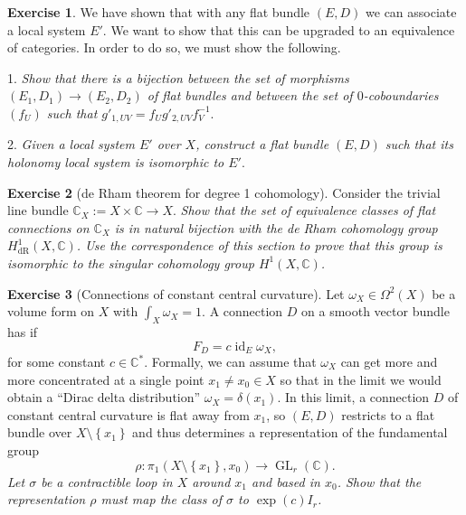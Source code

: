 \documentclass[12pt,a4paper]{amsbook}
\theoremstyle{remark} \newtheorem{rmk}[thm]{Remark}
\theoremstyle{definition} \newtheorem{defn}[thm]{Definition}
\theoremstyle{definition} \newtheorem{ex}[thm]{Example}
\theoremstyle{definition} \newtheorem{ej}{Exercise}
\let\emph\relax
\newcommand{\C}{\mathbb C}
\DeclareMathOperator{\GL}{GL}
\DeclareMathOperator{\id}{id}
\begin{document}
\begin{ej}
We have shown that with any flat bundle $(E,D)$ we can associate a local system $E'$. We want to show that this can be upgraded to an equivalence of categories. In order to do so, we must show the following.

1. \textit{Show that there is a bijection between the set of morphisms $(E_1,D_1)\rightarrow (E_2,D_2)$ of flat bundles and between the set of $0$-coboundaries $(f_U)$ such that $g'_{1,UV}=f_U g'_{2,UV} f_V^{-1}$}.

2. \textit{Given a local system $E'$ over $X$, construct a flat bundle $(E,D)$ such that its holonomy local system is isomorphic to $E'$}.
\end{ej}

\begin{ej}[de Rham theorem for degree 1 cohomology]
Consider the trivial line bundle $\C_X:=X\times \C\rightarrow X$. \textit{Show that the set of equivalence classes of flat connections on $\C_X$ is in natural bijection with the de Rham cohomology group  $H^1_{\mathrm{dR}}(X,\C)$. Use the correspondence of this section to prove that this group is isomorphic to the singular cohomology group $H^1(X,\C)$.}
\end{ej}

\begin{ej}[Connections of constant central curvature]
Let $\omega_X\in \Omega^2(X)$ be a volume form on $X$ with $\int_X \omega_X = 1$.	A connection $D$ on a smooth vector bundle has \emph{constant central curvature} if
\begin{equation*}
F_D = c \id_E \omega_X,
\end{equation*} 
for some constant $c\in \C^*$. Formally, we can assume that $\omega_X$ can get more and more concentrated at a single point $x_1\neq x_0 \in X$ so that in the limit we would obtain a ``Dirac delta distribution'' $\omega_X=\delta(x_1)$. In this limit, a connection $D$ of constant central curvature is flat away from $x_1$, so $(E,D)$ restricts to a flat bundle over $X\setminus \left\{x_1\right\}$ and thus determines a representation of the fundamental group
\begin{equation*}
\rho: \pi_1(X\setminus \left\{ x_1 \right\},x_0) \rightarrow \GL_r(\C).
\end{equation*} 
\textit{Let $\sigma$ be a contractible loop in $X$ around $x_1$ and based in  $x_0$.
Show that the representation $\rho$ must map the class of $\sigma$ to $\exp(c)I_r$.}
\end{ej}
\end{document}
